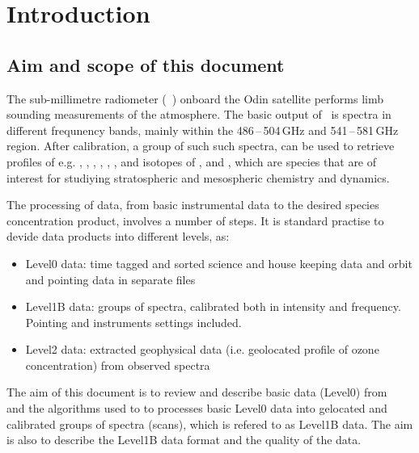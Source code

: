 \chapter{Introduction}
\label{chapter:introduction}

\setcounter{page}{1}


\section{Aim and scope of this document}
\label{sec:aim}

The sub-millimetre radiometer (\SMR\ ) onboard the Odin satellite
performs limb sounding measurements of the atmosphere.
The basic output of \smr\ is spectra in different frequnency
bands, mainly within the 486\,--\,504\,GHz and 541\,--\,581\,GHz region.
After calibration, a group of such such spectra, can be used
to retrieve profiles of e.g. , , , , 
, , and isotopes of , and ,
which are species that are of interest for studiying stratospheric and 
mesospheric chemistry and dynamics. 

The processing of data, from basic instrumental data to the
desired species concentration product, involves a number of steps.
It is standard practise to devide data products into different levels, as:

\begin{itemize}

\item Level0 data: time tagged and sorted science and house keeping data
and orbit and pointing data in separate files

\item Level1B data: groups of spectra, calibrated both in intensity and frequency. 
Pointing and instruments settings included.

\item Level2 data: extracted geophysical data (i.e. geolocated profile
of ozone concentration) from observed spectra

\end{itemize}


The aim of this document is to review and describe basic
data (Level0) from \smr\, and the algorithms used to 
to processes basic Level0 data into gelocated and calibrated 
groups of spectra (scans), which is refered to as Level1B data. 
The aim is also to describe the Level1B data format and 
the quality of the data.

